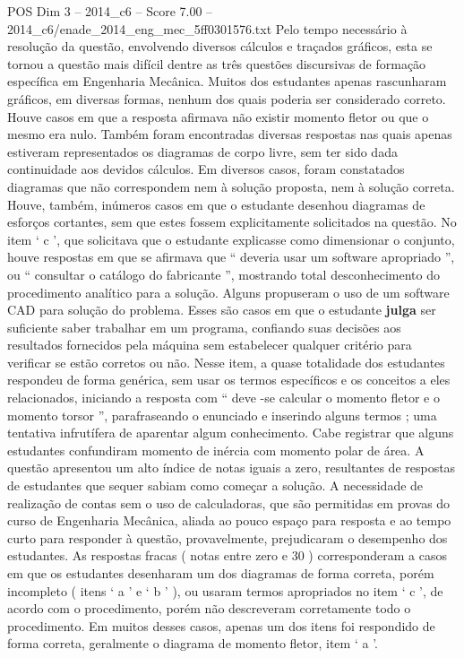 \begin{textsample}{POS Dim 3 – 2014\_c6 – Score 7.00 – 2014\_c6/enade\_2014\_eng\_mec\_5ff0301576.txt}
Pelo tempo necessário à resolução da questão, envolvendo diversos cálculos e traçados gráficos, esta se tornou a questão mais difícil dentre as três questões discursivas de formação específica em Engenharia Mecânica.
Muitos dos estudantes apenas rascunharam gráficos, em diversas formas, nenhum dos quais poderia ser considerado correto.
Houve casos em que a resposta afirmava não existir momento fletor ou que o mesmo era nulo.
Também foram encontradas diversas respostas nas quais apenas estiveram representados os diagramas de corpo livre, sem ter sido dada continuidade aos devidos cálculos.
Em diversos casos, foram constatados diagramas que não correspondem nem à solução proposta, nem à solução correta.
Houve, também, inúmeros casos em que o estudante desenhou diagramas de esforços cortantes, sem que estes fossem explicitamente solicitados na questão.
No item ‘ c ’, que solicitava que o estudante explicasse como dimensionar o conjunto, houve respostas em que se afirmava que “ deveria usar um software apropriado ”, ou “ consultar o catálogo do fabricante ”, mostrando total desconhecimento do procedimento analítico para a solução.
Alguns propuseram o uso de um software CAD para solução do problema.
Esses são casos em que o estudante \textbf{julga} ser suficiente saber trabalhar em um programa, confiando suas decisões aos resultados fornecidos pela máquina sem estabelecer qualquer critério para verificar se estão corretos ou não.
Nesse item, a quase totalidade dos estudantes respondeu de forma genérica, sem usar os termos específicos e os conceitos a eles relacionados, iniciando a resposta com “ deve -se calcular o momento fletor e o momento torsor ”, parafraseando o enunciado e inserindo alguns termos ; uma tentativa infrutífera de aparentar algum conhecimento.
Cabe registrar que alguns estudantes confundiram momento de inércia com momento polar de área.
A questão apresentou um alto índice de notas iguais a zero, resultantes de respostas de estudantes que sequer sabiam como começar a solução.
A necessidade de realização de contas sem o uso de calculadoras, que são permitidas em provas do curso de Engenharia Mecânica, aliada ao pouco espaço para resposta e ao tempo curto para responder à questão, provavelmente, prejudicaram o desempenho dos estudantes.
As respostas fracas ( notas entre zero e 30 ) corresponderam a casos em que os estudantes desenharam um dos diagramas de forma correta, porém incompleto ( itens ‘ a ’ e ‘ b ’ ), ou usaram termos apropriados no item ‘ c ’, de acordo com o procedimento, porém não descreveram corretamente todo o procedimento.
Em muitos desses casos, apenas um dos itens foi respondido de forma correta, geralmente o diagrama de momento fletor, item ‘ a ’.

\end{textsample}
